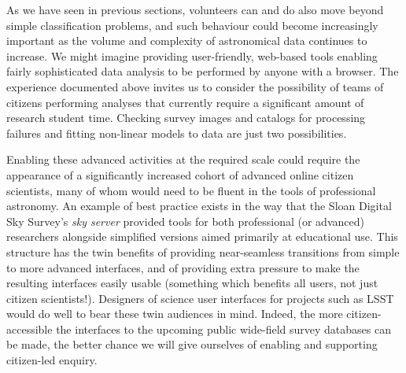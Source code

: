 \documentclass{ar2e}
\begin{document}



As we have seen in previous sections, volunteers can and do also move beyond
simple classification problems, and such behaviour could become increasingly
important as the volume and complexity of astronomical data continues to
increase. 
%
% 
% 
% 
% 
%
We might imagine providing user-friendly, web-based tools enabling  fairly
sophisticated data analysis to be performed by anyone with a browser. The
experience documented above invites us to consider the possibility of teams of
citizens  performing analyses that currently require a significant amount of
research student time. Checking survey images and catalogs  for processing
failures and fitting non-linear models to data are just two possibilities.

Enabling these advanced activities at the required scale could require the
appearance of a significantly increased cohort of advanced online citizen
scientists, many of whom would need to be fluent in the tools of professional
astronomy. An example of best practice exists in the way that the Sloan Digital
Sky Survey's \emph{sky server} provided tools for both professional (or
advanced) researchers alongside simplified versions aimed primarily at
educational use. This structure has the twin benefits of providing near-seamless
transitions from simple to more advanced interfaces, and of providing extra
pressure to make the resulting interfaces easily usable  (something which
benefits all users, not just citizen scientists!). Designers of science user
interfaces for projects such as LSST would do well to bear these twin audiences
in mind. Indeed, the more citizen-accessible the interfaces to the upcoming
public wide-field survey databases can be made, the better chance we will give
ourselves of enabling and supporting citizen-led enquiry.  
\end{document}
